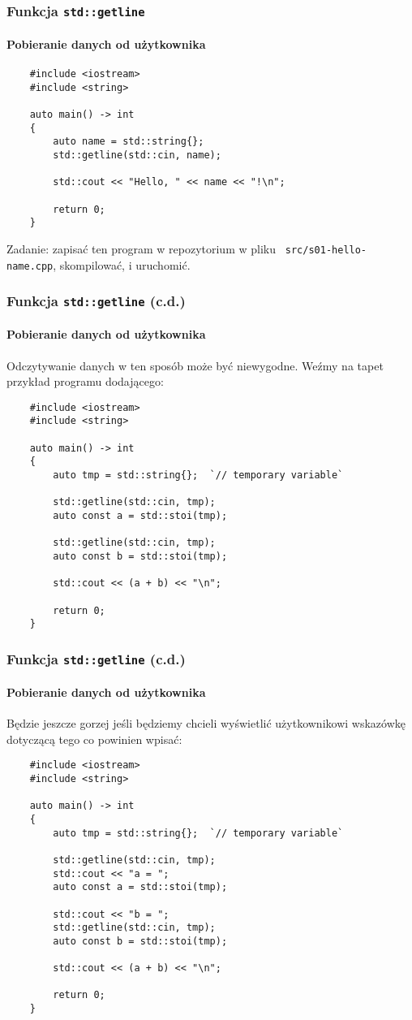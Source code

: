 \documentclass[aspectratio=169]{beamer}
\begin{document}
\begin{frame}[fragile]
    \frametitle{Funkcja {\tt std::getline}}
    \framesubtitle{Pobieranie danych od użytkownika}

    {\footnotesize
    \begin{lstlisting}
    #include <iostream>
    #include <string>

    auto main() -> int
    {
        auto name = std::string{};
        std::getline(std::cin, name);

        std::cout << "Hello, " << name << "!\n";

        return 0;
    }
    \end{lstlisting}}

    Zadanie: zapisać ten program w repozytorium w pliku {\tt
    src/s01-hello-name.cpp}, skompilować, i uruchomić.
    \label{lecture_exercise_3}
\end{frame}

\begin{frame}[fragile]
    \frametitle{Funkcja {\tt std::getline} (c.d.)}
    \framesubtitle{Pobieranie danych od użytkownika}

    Odczytywanie danych w ten sposób może być niewygodne. Weźmy na tapet
    przykład programu dodającego:

    {\tiny
    \begin{lstlisting}
    #include <iostream>
    #include <string>

    auto main() -> int
    {
        auto tmp = std::string{};  `// temporary variable`

        std::getline(std::cin, tmp);
        auto const a = std::stoi(tmp);

        std::getline(std::cin, tmp);
        auto const b = std::stoi(tmp);

        std::cout << (a + b) << "\n";

        return 0;
    }
    \end{lstlisting}}
\end{frame}

\begin{frame}[fragile]
    \frametitle{Funkcja {\tt std::getline} (c.d.)}
    \framesubtitle{Pobieranie danych od użytkownika}

    Będzie jeszcze gorzej jeśli będziemy chcieli wyświetlić użytkownikowi
    wskazówkę dotyczącą tego co powinien wpisać:

    {\tiny
    \begin{lstlisting}
    #include <iostream>
    #include <string>

    auto main() -> int
    {
        auto tmp = std::string{};  `// temporary variable`

        std::getline(std::cin, tmp);
        std::cout << "a = ";
        auto const a = std::stoi(tmp);

        std::cout << "b = ";
        std::getline(std::cin, tmp);
        auto const b = std::stoi(tmp);

        std::cout << (a + b) << "\n";

        return 0;
    }
    \end{lstlisting}}
\end{frame}
\end{document}
